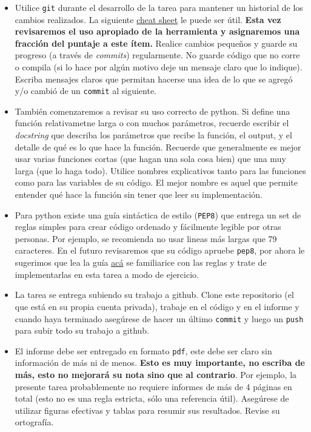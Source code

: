 \documentclass[letter, 11pt]{article}
\begin{document}
\vspace{1em}
\begin{itemize}

  \item Utilice \texttt{git} durante el desarrollo de la tarea para mantener un
    historial de los cambios realizados. La siguiente
    \href{https://education.github.com/git-cheat-sheet-education.pdf}{cheat
      sheet} le puede ser útil. {\bf Esta vez revisaremos el uso apropiado de
    la herramienta y asignaremos una fracción del puntaje a este ítem.} Realice
    cambios pequeños y guarde su progreso (a través de \emph{commits})
    regularmente. No guarde código que no corre o compila (si lo hace por algún
    motivo deje un mensaje claro que lo indique). Escriba mensajes claros que
    permitan hacerse una idea de lo que se agregó y/o cambió de un
    \texttt{commit} al siguiente.

  \item También comenzaremos a revisar su uso correcto de python. Si define una
    función relativametne larga o con muchos parámetros, recuerde escribir el
    \emph{docstring} que describa los parámetros que recibe la función, el
    output, y el detalle de qué es lo que hace la función. Recuerde que
    generalmente es mejor usar varias funciones cortas (que hagan una sola cosa
    bien) que una muy larga (que lo haga todo).  Utilice nombres explicativos
    tanto para las funciones como para las variables de su código. El mejor
    nombre es aquel que permite entender qué hace la función sin tener que leer
    su implementación.

  \item Para python existe una guía sintáctica de estilo (\texttt{PEP8}) que
    entrega un set de reglas simples para crear código ordenado y fácilmente
    legible por otras personas. Por ejemplo, se recomienda no usar lineas más
    largas que 79 caracteres. En el futuro revisaremos que su código apruebe
    \texttt{pep8}, por ahora le sugerimos que lea la guía
    \href{https://www.python.org/dev/peps/pep-0008/}{acá} se familiarice con
    las reglas y trate de implementarlas en esta tarea a modo de ejercicio.

  \item La tarea se entrega subiendo su trabajo a github. Clone este
    repositorio (el que está en su propia cuenta privada), trabaje en el código
    y en el informe y cuando haya terminado asegúrese de hacer un último
    \texttt{commit} y luego un \texttt{push} para subir todo su trabajo a
    github.

  \item El informe debe ser entregado en formato \texttt{pdf}, este debe ser
    claro sin información de más ni de menos. \textbf{Esto es muy importante,
    no escriba de más, esto no mejorará su nota sino que al contrario}. Por
    ejemplo, la presente tarea probablemente no requiere informes de más de 4
    páginas en total (esto no es una regla estricta, sólo una referencia útil).
    Asegúrese de utilizar figuras efectivas y tablas para resumir sus
    resultados. Revise su ortografía.

\end{itemize}

\end{document}
